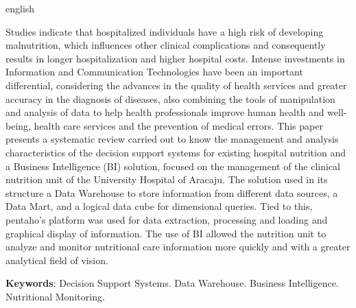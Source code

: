 \setlength{\absparsep}{18pt} %
\begin{resumo}[Abstract]
 \begin{otherlanguage*}{english}
   
Studies indicate that hospitalized individuals have a high risk of developing malnutrition, which influences other clinical complications and consequently results in longer hospitalization and higher hospital costs. Intense investments in Information and Communication Technologies have been an important differential, considering the advances in the quality of health services and greater accuracy in the diagnosis of diseases, also combining the tools of manipulation and analysis of data to help health professionals improve human health and well-being, health care services and the prevention of medical errors. This paper presents a systematic review carried out to know the management and analysis characteristics of the decision support systems for existing hospital nutrition and a Business Intelligence (BI) solution, focused on the management of the clinical nutrition unit of the University Hospital of Aracaju. The solution used in its structure a Data Warehouse to store information from different data sources, a Data Mart, and a logical data cube for dimensional queries. Tied to this, pentaho's platform was used for data extraction, processing and loading and graphical display of information. The use of BI allowed the nutrition unit to analyze and monitor nutritional care information more quickly and with a greater analytical field of vision. 

   \vspace{\onelineskip}
 
   \noindent 
   \textbf{Keywords}: Decision Support Systems. Data Warehouse. Business Intelligence. Nutritional Monitoring.
 \end{otherlanguage*}
\end{resumo}